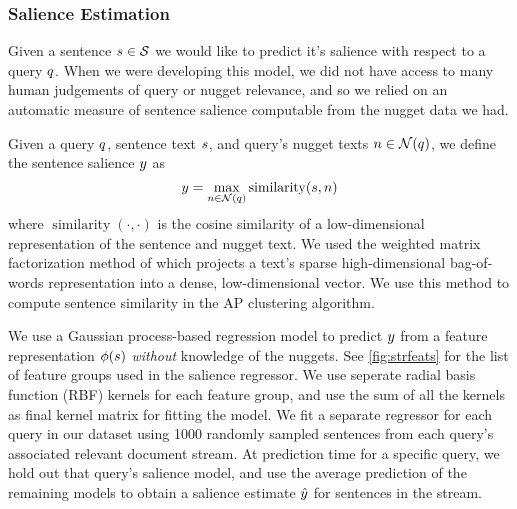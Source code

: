   \subsubsection{Salience Estimation}

  Given a sentence $s \in \mathcal{S}$ we would like to predict it's 
  salience with respect to a query $q$. When we were developing this 
  model,
  we did not have access to many human judgements of query or nugget relevance,
  and so we relied on an automatic measure of sentence salience computable
 from the nugget data we had.

Given a query $q$, sentence text $s$, and query's nugget texts 
$n \in \mathcal{N}(q)$, we define
the sentence salience $y$ as
\[ y = \max_{n \in  \mathcal{N}(q)} \operatorname{similarity}(s, n)\]
where $\operatorname{similarity}(\cdot, \cdot)$ is the cosine similarity of a
low-dimensional representation of the sentence and nugget text.
We used the weighted matrix factorization method of \cite{guo2012simple}
which projects a text's sparse high-dimensional bag-of-words representation
into a dense, low-dimensional vector. We use this method to compute 
sentence similarity in the AP clustering algorithm.



We use a Gaussian process-based regression model \citep{rasmussen2004gaussian}
to predict $y$ from a feature representation $\phi(s)$ 
\emph{without} knowledge of the nuggets. See \autoref{fig:strfeats}
for the list of feature groups used in the salience regressor.
We use seperate radial basis function (RBF) kernels for each 
feature group, and use the sum of all the kernels as final
kernel matrix for fitting the model.
We fit a separate regressor for each query in our dataset using 1000
randomly sampled sentences from each query's associated relevant document 
stream. At prediction time for a specific query, we hold out that query's salience
model, and use the average prediction of the remaining models to obtain
a salience estimate $\hat{y}$ for sentences in the stream.

